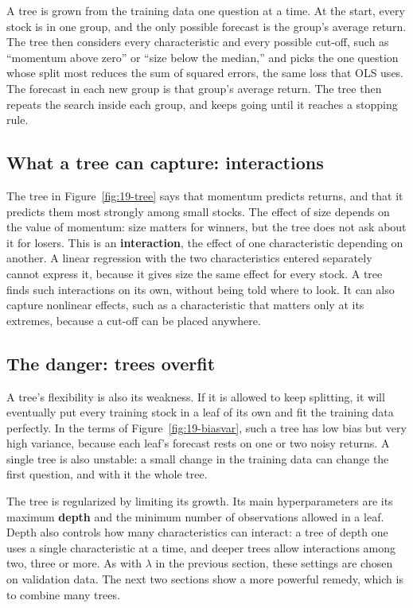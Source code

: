 A tree is grown from the training data one question at a time. At the start, every stock is in one group, and the only possible forecast is the group's average return. The tree then considers every characteristic and every possible cut-off, such as ``momentum above zero'' or ``size below the median,'' and picks the one question whose split most reduces the sum of squared errors, the same loss that OLS uses. The forecast in each new group is that group's average return. The tree then repeats the search inside each group, and keeps going until it reaches a stopping rule.

\subsection{What a tree can capture: interactions}

The tree in Figure~\ref{fig:19-tree} says that momentum predicts returns, and that it predicts them most strongly among small stocks. The effect of size depends on the value of momentum: size matters for winners, but the tree does not ask about it for losers. This is an \textbf{interaction}, the effect of one characteristic depending on another. A linear regression with the two characteristics entered separately cannot express it, because it gives size the same effect for every stock. A tree finds such interactions on its own, without being told where to look. It can also capture nonlinear effects, such as a characteristic that matters only at its extremes, because a cut-off can be placed anywhere.

\subsection{The danger: trees overfit}

A tree's flexibility is also its weakness. If it is allowed to keep splitting, it will eventually put every training stock in a leaf of its own and fit the training data perfectly. In the terms of Figure~\ref{fig:19-biasvar}, such a tree has low bias but very high variance, because each leaf's forecast rests on one or two noisy returns. A single tree is also unstable: a small change in the training data can change the first question, and with it the whole tree.

The tree is regularized by limiting its growth. Its main hyperparameters are its maximum \textbf{depth} and the minimum number of observations allowed in a leaf. Depth also controls how many characteristics can interact: a tree of depth one uses a single characteristic at a time, and deeper trees allow interactions among two, three or more. As with $\lambda$ in the previous section, these settings are chosen on validation data. The next two sections show a more powerful remedy, which is to combine many trees.

